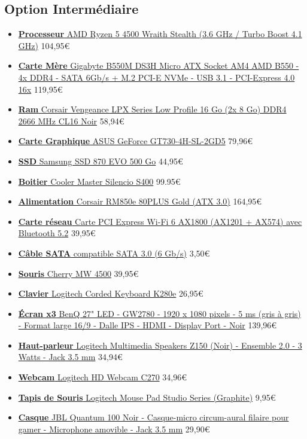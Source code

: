 \subsection{Option Intermédiaire}

\begin{itemize}
	\item \href{https://www.ldlc.com/fiche/PB00497548.html}{\textbf{Processeur} AMD Ryzen 5 4500 Wraith Stealth (3.6 GHz / Turbo Boost 4.1 GHz)} 104,95\euro
	\item \href{https://www.ldlc.com/fiche/PB00346172.html}{\textbf{Carte Mère} Gigabyte B550M DS3H Micro ATX Socket AM4 AMD B550 - 4x DDR4 - SATA 6Gb/s + M.2 PCI-E NVMe - USB 3.1 - PCI-Express 4.0 16x} 119,95\euro
	\item \href{https://www.ldlc.com/fiche/PB00191551.html}{\textbf{Ram} Corsair Vengeance LPX Series Low Profile 16 Go (2x 8 Go) DDR4 2666 MHz CL16 Noir} 58,94\euro
	\item \href{https://www.ldlc.com/fiche/PB00462561.html}{\textbf{Carte Graphique} ASUS GeForce GT730-4H-SL-2GD5} 79,96\euro
	\item \href{https://www.ldlc.com/fiche/PB00402115.html}{\textbf{SSD} Samsung SSD 870 EVO 500 Go} 44,95\euro
	\item \href{https://www.ldlc.com/fiche/PB00275652.html}{\textbf{Boitier} Cooler Master Silencio S400} 99.95\euro
	\item \href{https://www.ldlc.com/fiche/PB00548770.html}{\textbf{Alimentation} Corsair RM850e 80PLUS Gold (ATX 3.0)} 164,95\euro
	\item \href{https://www.ldlc.com/fiche/PB00487856.html}{\textbf{Carte réseau} Carte PCI Express Wi-Fi 6 AX1800 (AX1201 + AX574) avec Bluetooth 5.2} 39,95\euro
	\item \href{https://www.ldlc.com/fiche/PB00016236.html}{\textbf{Câble SATA} compatible SATA 3.0 (6 Gb/s)} 3,50\euro
	\item \href{https://www.ldlc.com/fiche/PB00243882.html}{\textbf{Souris} Cherry MW 4500} 39,95\euro
	\item \href{https://www.ldlc.com/fiche/PB00242405.html}{\textbf{Clavier} Logitech Corded Keyboard K280e} 26,95\euro
	\item \href{https://www.ldlc.com/fiche/PB00233120.html}{\textbf{Écran x3} BenQ 27" LED - GW2780 - 1920 x 1080 pixels - 5 ms (gris à gris) - Format large 16/9 - Dalle IPS - HDMI - Display Port - Noir} 139,96\euro
	\item \href{https://www.ldlc.com/fiche/PB00154969.html}{\textbf{Haut-parleur} Logitech Multimedia Speakers Z150 (Noir) - Ensemble 2.0 - 3 Watts - Jack 3.5 mm} 34,94\euro
	\item \href{https://www.ldlc.com/fiche/PB00213751.html}{\textbf{Webcam} Logitech HD Webcam C270} 34,96\euro
	\item \href{https://www.ldlc.com/fiche/PB00466685.html}{\textbf{Tapis de Souris} Logitech Mouse Pad Studio Series (Graphite)} 9,95\euro
	\item \href{https://www.ldlc.com/fiche/PB00366138.html}{\textbf{Casque} JBL Quantum 100 Noir - Casque-micro circum-aural filaire pour gamer - Microphone amovible - Jack 3.5 mm} 29,90\euro
\end{itemize}
